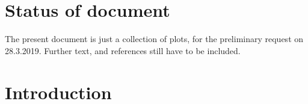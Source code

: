 \documentclass[12pt]{article}
\begin{document}





\clearpage

\pagestyle{plain} %


\section{Status of document}
The present document is just a collection of plots, for the preliminary request on 28.3.2019.
Further text, and references still have to be included.

\section{Introduction}

%




\end{document}
